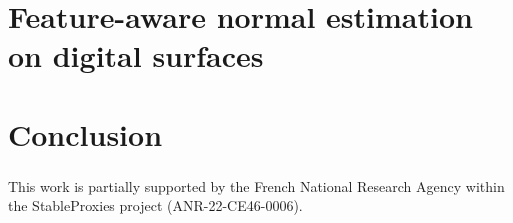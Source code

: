 \documentclass[runningheads]{llncs}
\begin{document}


    \section{Feature-aware normal estimation on digital surfaces}



    \section{Conclusion}


    \begin{credits}
        \subsubsection{\ackname}
        This work is partially supported by the French National Research Agency
        within the StableProxies project (ANR-22-CE46-0006).
    \end{credits}
%
%
%
    
    
\end{document}

